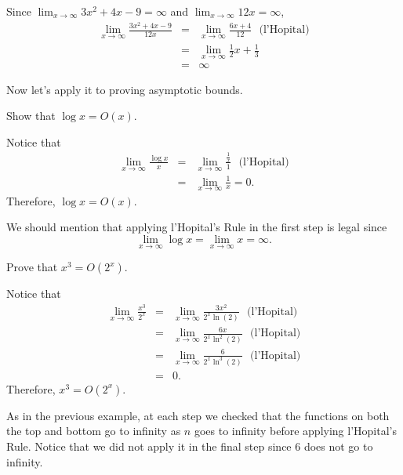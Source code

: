 \begin{exa}
Since $\displaystyle \lim_{x\rightarrow\infty} 3x^2+4x-9=\infty$ and
$\displaystyle \lim_{x\rightarrow\infty} 12x=\infty$, 
\begin{eqnarray*}
\lim_{x\rightarrow\infty} \frac{3x^2+4x-9}{12x}
&=&\lim_{x\rightarrow\infty} \frac{6x+4}{12} \, \, \, \,   \mbox{(l'Hopital)}\\
&=&\lim_{x\rightarrow\infty} \frac{1}{2}x+\frac{1}{3}\\
&=&\infty
\end{eqnarray*}
\end{exa}

Now let's apply it to proving asymptotic bounds.

\begin{exa}
Show that $\log x=O(x)$.
\begin{pf}
Notice that 
\begin{eqnarray*}
\lim_{x\rightarrow\infty} \frac{\log x}{ x}
&=&\lim_{x\rightarrow\infty} \frac{\frac{1}{ x}}{ 1}\, \, \, \,  \mbox{(l'Hopital)} \\
&=&\lim_{x\rightarrow\infty} \frac{1}{ x}= 0.
\end{eqnarray*}
Therefore, $\log x=O(x)$.
\end{pf}
We should mention that applying l'Hopital's Rule in the first step is legal since 
$$\lim_{x\rightarrow\infty} \log x = \lim_{x\rightarrow\infty}  x=\infty.$$
\end{exa}

\begin{exa}
Prove that $x^3=O(2^x)$.
\begin{pf}
Notice that \begin{eqnarray*}
\lim_{x\rightarrow\infty} \frac{x^3}{2^x}
&=&\lim_{x\rightarrow\infty} \frac{3x^2}{2^x\ln(2)}\, \, \, \,  \mbox{(l'Hopital)} \\
&=&\lim_{x\rightarrow\infty} \frac{6x}{2^x\ln^2(2)}\, \, \, \,  \mbox{(l'Hopital)} \\
&=&\lim_{x\rightarrow\infty} \frac{6}{2^x\ln^3(2)}\, \, \, \,  \mbox{(l'Hopital)} \\
&=&0.
\end{eqnarray*}
Therefore, $x^3=O(2^x)$.

As in the previous example, at each step we checked that the functions on 
both the top and bottom
go to infinity as $n$ goes to infinity before applying l'Hopital's Rule.
Notice that we did not apply it in the final step since $6$ does not go to infinity.
\end{pf}
\end{exa}

